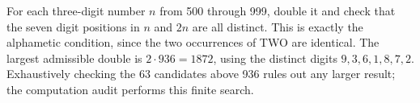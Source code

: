 For each three-digit number $n$ from 500 through 999, double it and check that the seven digit positions in $n$ and $2n$ are all distinct. This is exactly the alphametic condition, since the two occurrences of TWO are identical. The largest admissible double is $2\cdot936=\boxed{1872}$, using the distinct digits $9,3,6,1,8,7,2$. Exhaustively checking the 63 candidates above 936 rules out any larger result; the computation audit performs this finite search.
